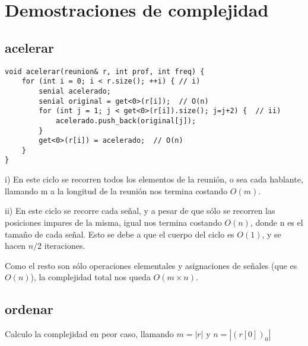 \documentclass{article}
\begin{document}
\maketitle

\tableofcontents
\newpage


\newpage
{}
\section*{Demostraciones de complejidad}
\vspace{0.5cm}
\subsection{acelerar}
\begin{lstlisting}
void acelerar(reunion& r, int prof, int freq) {
    for (int i = 0; i < r.size(); ++i) { // i)
        senial acelerado;
        senial original = get<0>(r[i]);  // O(n)
        for (int j = 1; j < get<0>(r[i]).size(); j=j+2) {  // ii)
            acelerado.push_back(original[j]);
        }
        get<0>(r[i]) = acelerado;  // O(n)
    }
}
\end{lstlisting}

i) En este ciclo se recorren todos los elementos de la reunión, o sea cada hablante, llamando m a la
longitud de la reunión nos termina costando $O(m)$.

ii) En este ciclo se recorre cada señal, y a pesar de que sólo se recorren las posiciones impares de la misma,
igual nos termina costando $O(n)$, donde n es el tamaño de cada señal. Esto se debe a que el cuerpo del ciclo es
$O(1)$, y se hacen $n/2$ iteraciones.

Como el resto son sólo operaciones elementales y asignaciones de señales (que es $O(n)$), la complejidad total nos queda $O(m \times n)$.


\newpage
\subsection{ordenar}
Calculo la complejidad en peor caso, llamando $m=|r|$ y $n=|(r[0])_0|$ \newline
\end{document}

